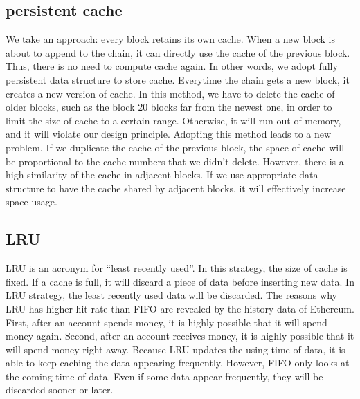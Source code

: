 \documentclass[conference]{IEEEtran}
\begin{document}
\subsection{persistent cache}
We take an approach: every block retains its own cache. When a new block is about to append to the chain, it can directly use the cache of the previous block. Thus, there is no need to compute cache again. In other words, we adopt fully persistent data structure to store cache. Everytime the chain gets a new block, it creates a new version of cache.
In this method, we have to delete the cache of older blocks, such as the block 20 blocks far from the newest one, in order to limit the size of cache to a certain range. Otherwise, it will run out of memory, and it will violate our design principle.
Adopting this method leads to a new problem. If we duplicate the cache of the previous block, the space of cache will be proportional to the cache numbers that we didn’t delete. However, there is a high similarity of the cache in adjacent blocks. If we use appropriate data structure to have the cache shared by adjacent blocks, it will effectively increase space usage.

\subsection{LRU}
LRU is an acronym for “least recently used”.
In this strategy, the size of cache is fixed.
If a cache is full, it will discard a piece of data before inserting new data.
In LRU strategy, the least recently used data will be discarded.
The reasons why LRU has higher hit rate than FIFO are revealed by the history data of Ethereum.
First, after an account spends money,
it is highly possible that it will spend money again.
Second, after an account receives money,
it is highly possible that it will spend money right away.
Because LRU updates the using time of data,
it is able to keep caching the data appearing frequently.
However, FIFO only looks at the coming time of data.
Even if some data appear frequently,
they will be discarded sooner or later.
\end{document}
